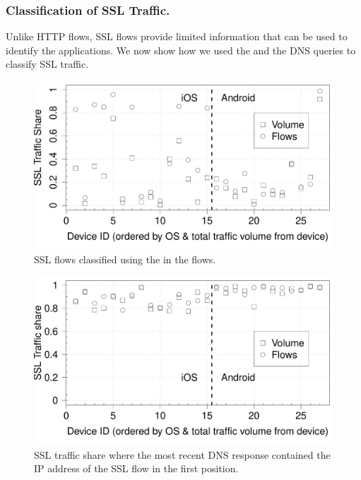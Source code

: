 \subsubsection{Classification of SSL Traffic.}

Unlike HTTP flows, SSL flows provide limited information that can be used to identify the applications. 
We now show how we used the \sslservername and the DNS queries to classify SSL traffic. 

\begin{figure}[t]
\includegraphics[width=\columnwidth]{plots/sslanalysis_someservername_traffic.pdf}
\caption{SSL flows classified using the \sslservername in the flows.}
\label{fig:ssl-classification-servername}
\end{figure}
\begin{figure}[t]
\includegraphics[width=\columnwidth]{plots/sslanalysis_samedns_traffic.pdf}
\caption{SSL traffic share where the most recent DNS response contained the IP address of the SSL flow in the first position.}
\label{fig:ssl-classification-app-service}
\end{figure}


